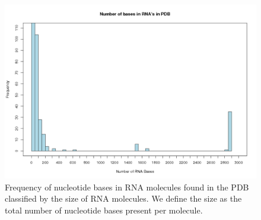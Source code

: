 \begin{figure}[H]
\centering
\includegraphics[scale=0.60]{Chapter2/histogram.png}
\caption{Frequency of nucleotide bases in RNA molecules found in the
  PDB classified by the size of RNA molecules. We define the size as the
  total number of nucleotide bases present per molecule.}
  \label{fig:rnaranges}
\end{figure}

